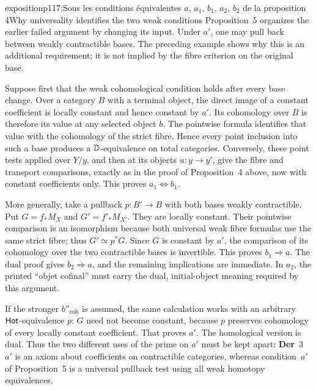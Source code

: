 \begin{dcomment}{exposition}{p117:Sous les conditions équivalentes $a$, $a_1$, $b_1$, $a_2$, $b_2$ de la proposition 4}{Why universality identifies the two weak conditions}
Proposition~5 organizes the earlier failed argument by changing its input. Under $a'$, one may pull back between weakly contractible bases. The preceding example shows why this is an additional requirement; it is not implied by the fibre criterion on the original base.

Suppose first that the weak cohomological condition holds after every base change. Over a category $B$ with a terminal object, the direct image of a constant coefficient is locally constant and hence constant by $a'$. Its cohomology over $B$ is therefore its value at any selected object $b$. The pointwise formula identifies that value with the cohomology of the strict fibre. Hence every point inclusion into such a base produces a $\mathbb{D}$-equivalence on total categories. Conversely, these point tests applied over $Y/y$, and then at its objects $u:y\to y'$, give the fibre and transport comparisons, exactly as in the proof of Proposition~4 above, now with constant coefficients only. This proves $a_1\Leftrightarrow b_1$.

More generally, take a pullback $p:B'\to B$ with both bases weakly contractible. Put $G=f_*M_X$ and $G'=f'_*M_{X'}$. They are locally constant. Their pointwise comparison is an isomorphism because both universal weak fibre formulas use the same strict fibre; thus $G'\simeq p^*G$. Since $G$ is constant by $a'$, the comparison of its cohomology over the two contractible bases is invertible. This proves $b_1\Rightarrow a$. The dual proof gives $b_2\Rightarrow a$, and the remaining implications are immediate. In $a_2$, the printed ``objet cofinal'' must carry the dual, initial-object meaning required by this argument.

If the stronger $b''_{\mathrm{coh}}$ is assumed, the same calculation works with an arbitrary $\mathsf{Hot}$-equivalence $p$: $G$ need not become constant, because $p$ preserves cohomology of every locally constant coefficient. That proves $a'$. The homological version is dual. Thus the two different uses of the prime on $a'$ must be kept apart: \textbf{Der}~3~$a'$ is an axiom about coefficients on contractible categories, whereas condition~$a'$ of Proposition~5 is a universal pullback test using all weak homotopy equivalences.
\end{dcomment}


